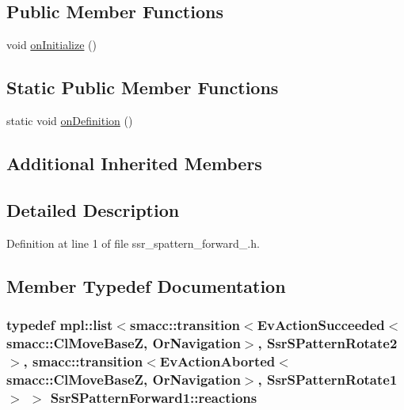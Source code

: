 \subsection*{Public Member Functions}
\begin{DoxyCompactItemize}
\item 
void \hyperlink{structSsrSPatternForward1_a4dcbd54092d60be69442ff7009a9b774}{on\+Initialize} ()
\end{DoxyCompactItemize}
\subsection*{Static Public Member Functions}
\begin{DoxyCompactItemize}
\item 
static void \hyperlink{structSsrSPatternForward1_a2e6358624ff796d27f68636609e2ce3d}{on\+Definition} ()
\end{DoxyCompactItemize}
\subsection*{Additional Inherited Members}


\subsection{Detailed Description}


Definition at line 1 of file ssr\+\_\+spattern\+\_\+forward\+\_.\+h.



\subsection{Member Typedef Documentation}
\subsubsection[{\texorpdfstring{reactions}{reactions}}]{\setlength{\rightskip}{0pt plus 5cm}typedef mpl\+::list$<${\bf smacc\+::transition}$<$Ev\+Action\+Succeeded$<${\bf smacc\+::\+Cl\+Move\+BaseZ}, {\bf Or\+Navigation}$>$, {\bf Ssr\+S\+Pattern\+Rotate2}$>$, {\bf smacc\+::transition}$<$Ev\+Action\+Aborted$<${\bf smacc\+::\+Cl\+Move\+BaseZ}, {\bf Or\+Navigation}$>$, {\bf Ssr\+S\+Pattern\+Rotate1}$>$ $>$ {\bf Ssr\+S\+Pattern\+Forward1\+::reactions}}\hypertarget{structSsrSPatternForward1_a78e21524356c8c071893bf7e41a98558}{}\label{structSsrSPatternForward1_a78e21524356c8c071893bf7e41a98558}


